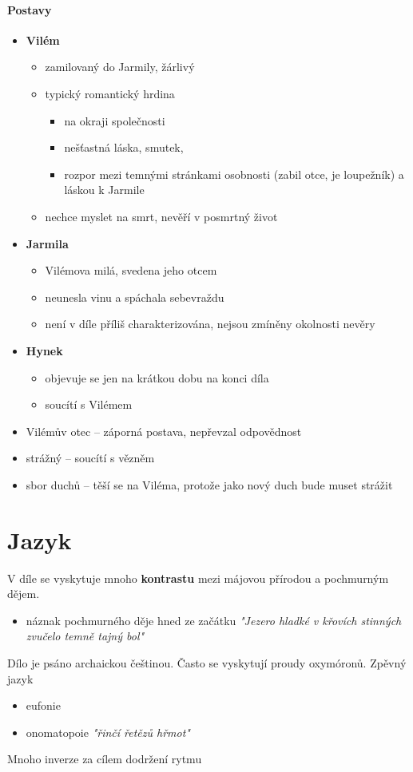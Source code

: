 \documentclass[10pt,a4paper]{article}
\begin{document}
\paragraph{Postavy}
\begin{itemize}
\item \textbf{Vilém}
	\begin{itemize}
	\item zamilovaný do Jarmily, žárlivý
	\item typický romantický hrdina
		\begin{itemize}
		\item na okraji společnosti
		\item nešťastná láska, smutek, 
		\item rozpor mezi temnými stránkami osobnosti (zabil otce, je loupežník) a láskou k Jarmile
		\end{itemize}
	\item nechce myslet na smrt, nevěří v posmrtný život
	\end{itemize}
\item \textbf{Jarmila}
	\begin{itemize}
	\item Vilémova milá, svedena jeho otcem
	\item neunesla vinu a spáchala sebevraždu
	\item není v díle příliš charakterizována, nejsou zmíněny okolnosti nevěry
	\end{itemize}
\item \textbf{Hynek}
	\begin{itemize}
	\item objevuje se jen na krátkou dobu na konci díla
	\item soucítí s Vilémem
	\end{itemize}
\item Vilémův otec -- záporná postava, nepřevzal odpovědnost
\item strážný -- soucítí s vězněm
\item sbor duchů -- těší se na Viléma, protože jako nový duch bude muset strážit
\end{itemize}
\section*{Jazyk}
V díle se vyskytuje mnoho \textbf{kontrastu} mezi májovou přírodou a pochmurným dějem.
\begin{itemize}
\item náznak pochmurného děje hned ze začátku \textit{"Jezero hladké v křovích stinných zvučelo temně tajný bol"}
\end{itemize}
Dílo je psáno archaickou češtinou. Často se vyskytují proudy oxymóronů. 
Zpěvný jazyk 
\begin{itemize}
\item eufonie
\item onomatopoie \textit{"řinčí řetězů hřmot"}
\end{itemize}
Mnoho inverze za cílem dodržení rytmu
\end{document}
